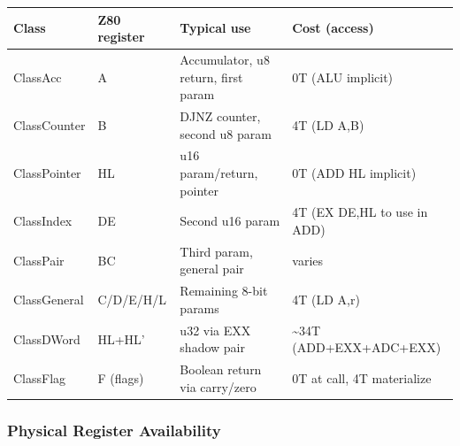 \documentclass[
  11pt,
]{article}
\begin{document}
\begin{longtable}[]{@{}
  >{\raggedright\arraybackslash}p{}
  >{\raggedright\arraybackslash}p{}
  >{\raggedright\arraybackslash}p{}
  >{\raggedright\arraybackslash}p{}@{}}
\toprule\noalign{}
\begin{minipage}[b]{\linewidth}\raggedright
Class
\end{minipage} & \begin{minipage}[b]{\linewidth}\raggedright
Z80 register
\end{minipage} & \begin{minipage}[b]{\linewidth}\raggedright
Typical use
\end{minipage} & \begin{minipage}[b]{\linewidth}\raggedright
Cost (access)
\end{minipage} \\
\midrule\noalign{}
\endhead
\bottomrule\noalign{}
\endlastfoot
ClassAcc & A & Accumulator, u8 return, first param & 0T (ALU
implicit) \\
ClassCounter & B & DJNZ counter, second u8 param & 4T (LD A,B) \\
ClassPointer & HL & u16 param/return, pointer & 0T (ADD HL implicit) \\
ClassIndex & DE & Second u16 param & 4T (EX DE,HL to use in ADD) \\
ClassPair & BC & Third param, general pair & varies \\
ClassGeneral & C/D/E/H/L & Remaining 8-bit params & 4T (LD A,r) \\
ClassDWord & HL+HL' & u32 via EXX shadow pair & \textasciitilde34T
(ADD+EXX+ADC+EXX) \\
ClassFlag & F (flags) & Boolean return via carry/zero & 0T at call, 4T
materialize \\
\end{longtable}

\subsubsection{Physical Register
Availability}\label{physical-register-availability}
\end{document}

